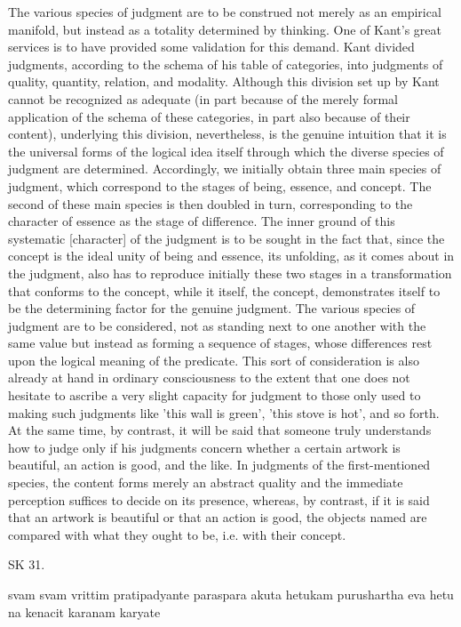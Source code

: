 The various species of judgment are to be
construed not merely as an empirical manifold,
but instead as a totality determined by thinking.
One of Kant's great services is to have provided some validation for this demand.
Kant divided judgments, according to the schema of his table of categories,
into judgments of quality, quantity, relation, and modality.
Although this division set up by Kant cannot be recognized as adequate
(in part because of the merely formal application of the schema of these categories,
in part also because of their content),
underlying this division, nevertheless, is the genuine intuition that
it is the universal forms of the logical idea itself
through which the diverse species of judgment are determined.
Accordingly, we initially obtain three main species of judgment,
which correspond to the stages of being, essence, and concept.
The second of these main species is then doubled in turn,
corresponding to the character of essence as the stage of difference.
The inner ground of this systematic [character] of
the judgment is to be sought in the fact that,
since the concept is the ideal unity of being and essence,
its unfolding, as it comes about in the judgment, also
has to reproduce initially these two stages in a transformation that
conforms to the concept, while it itself, the concept,
demonstrates itself to be the determining factor for the genuine judgment.
The various species of judgment are to be considered,
not as standing next to one another with the same value but
instead as forming a sequence of stages, whose differences
rest upon the logical meaning of the predicate.
This sort of consideration is also already at hand in
ordinary consciousness to the extent that one does not hesitate to ascribe a very
slight capacity for judgment to those only used to making such judgments like
'this wall is green', 'this stove is hot', and so forth.
At the same time, by contrast, it will be said that someone truly understands
how to judge only if his judgments concern whether a certain artwork is beautiful,
an action is good, and the like.
In judgments of the first-mentioned species, the content forms merely an abstract
quality and the immediate perception suffices to decide on its presence, whereas,
by contrast, if it is said that an artwork is beautiful or that an action is good,
the objects named are compared with what they ought to be, i.e. with their concept.

SK 31.

svam svam vrittim pratipadyante paraspara akuta hetukam
purushartha eva hetu na kenacit karanam karyate

